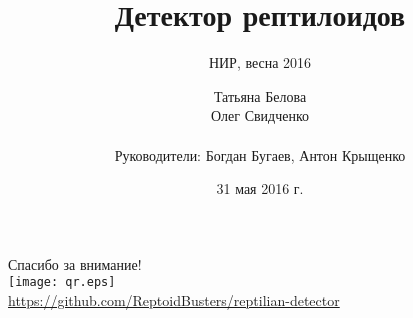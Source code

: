 \documentclass[10pt,pdf,hyperref={unicode}]{beamer}
\begin{document}
\title[Детектор рептилоидов]{Детектор рептилоидов}
\subtitle{НИР, весна 2016}
\author{Татьяна Белова \\ Олег Свидченко \\~\\
        Руководители: Богдан Бугаев, Антон Крыщенко}
\date{31 мая 2016 г.}

\begin{frame}
    \titlepage
\end{frame}




\begin{frame}
    \begin{center}
        Спасибо за внимание! \\
        \texttt{[image: qr.eps]} \\
        \url{https://github.com/ReptoidBusters/reptilian-detector}
    \end{center}
\end{frame}
\end{document}
